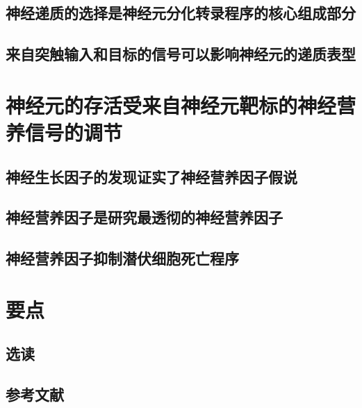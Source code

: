 \subsection{神经递质的选择是神经元分化转录程序的核心组成部分}
\subsection{来自突触输入和目标的信号可以影响神经元的递质表型}

\section{神经元的存活受来自神经元靶标的神经营养信号的调节}
\subsection{神经生长因子的发现证实了神经营养因子假说}
\subsection{神经营养因子是研究最透彻的神经营养因子}
\subsection{神经营养因子抑制潜伏细胞死亡程序}

\section{要点}
\subsection{选读}
\subsection{参考文献}